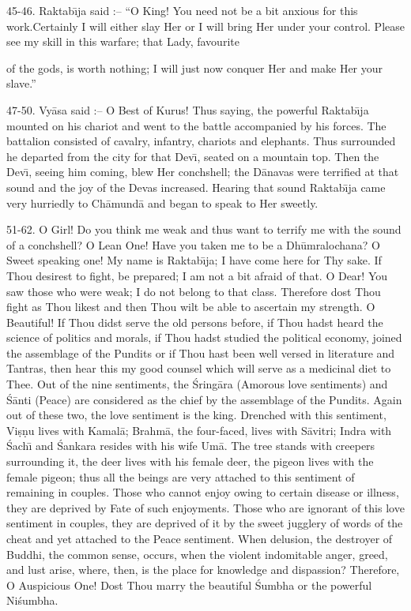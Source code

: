 45-46. Raktab\={\i}ja said :-- ``O King! You need not be a bit anxious for this work.Certainly I will either slay Her or I will bring Her under your control. Please see my skill in this warfare; that Lady, favourite

of the gods, is worth nothing; I will just now conquer Her and make Her your slave.''

47-50. Vy\=asa said :-- O Best of Kurus! Thus saying, the powerful Raktab\={\i}ja mounted on his chariot and went to the battle accompanied by his forces. The battalion consisted of cavalry, infantry, chariots and elephants. Thus surrounded he departed from the city for that Dev\={\i}, seated on a mountain top. Then the Dev\={\i}, seeing him coming, blew Her conchshell; the D\=anavas were terrified at that sound and the joy of the Devas increased. Hearing that sound Raktab\={\i}ja came very hurriedly to Ch\=amund\=a and began to speak to Her sweetly.

51-62. O Girl! Do you think me weak and thus want to terrify me with the sound of a conchshell? O Lean One! Have you taken me to be a Dh\=umralochana? O Sweet speaking one! My name is Raktab\={\i}ja; I have come here for Thy sake. If Thou desirest to fight, be prepared; I am not a bit afraid of that. O Dear! You saw those who were weak; I do not belong to that class. Therefore dost Thou fight as Thou likest and then Thou wilt be able to ascertain my strength. O Beautiful! If Thou didst serve the old persons before, if Thou hadst heard the science of politics and morals, if Thou hadst studied the political economy, joined the assemblage of the Pundits or if Thou hast been well versed in literature and Tantras, then hear this my good counsel which will serve as a medicinal diet to Thee. Out of the nine sentiments, the \'Sring\=ara (Amorous love sentiments) and \'S\=anti (Peace) are considered as the chief by the assemblage of the Pundits. Again out of these two, the love sentiment is the king. Drenched with this sentiment, Vi\d{s}\d{n}u lives with Kamal\=a; Brahm\=a, the four-faced, lives with S\=avitri; Indra with \'Sach\={\i} and \'Sankara resides with his wife Um\=a. The tree stands with creepers surrounding it, the deer lives with his female deer, the pigeon lives with the female pigeon; thus all the beings are very attached to this sentiment of remaining in couples. Those who cannot enjoy owing to certain disease or illness, they are deprived by Fate of such enjoyments. Those who are ignorant of this love sentiment in couples, they are deprived of it by the sweet jugglery of words of the cheat and yet attached to the Peace sentiment. When delusion, the destroyer of Buddhi, the common sense, occurs, when the violent indomitable anger, greed, and lust arise, where, then, is the place for knowledge and dispassion? Therefore, O Auspicious One! Dost Thou marry the beautiful \'Sumbha or the powerful Ni\'sumbha.

